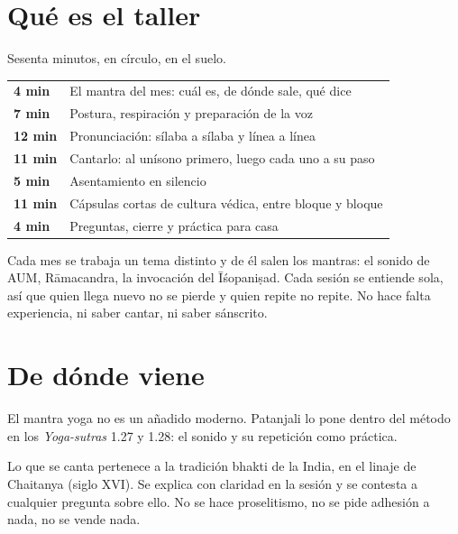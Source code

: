 \documentclass[11pt,a4paper]{article}
\begin{document}
\section{Qué es el taller}

Sesenta minutos, en círculo, en el suelo.

\vspace{0.4em}
{\setlength{\extrarowheight}{3pt}
\begin{tabularx}{\textwidth}{@{}>{\titular\bfseries\color{ocre}}l@{\hspace{1.3em}}X@{}}
\toprule
4 min  & El mantra del mes: cuál es, de dónde sale, qué dice \\
7 min  & Postura, respiración y preparación de la voz \\
12 min & Pronunciación: sílaba a sílaba y línea a línea \\
11 min & Cantarlo: al unísono primero, luego cada uno a su paso \\
5 min  & Asentamiento en silencio \\
11 min & Cápsulas cortas de cultura védica, entre bloque y bloque \\
4 min  & Preguntas, cierre y práctica para casa \\
\bottomrule
\end{tabularx}}

\vspace{0.6em}
Cada mes se trabaja un tema distinto y de él salen los mantras: el sonido de
AUM, R\=amacandra, la invocaci\'on del \=I\'sopani\d{s}ad. Cada sesión se entiende sola, así
que quien llega nuevo no se pierde y quien repite no repite. No hace falta
experiencia, ni saber cantar, ni saber sánscrito.

\newpage


\section{De dónde viene}

El mantra yoga no es un añadido moderno. Patanjali lo pone dentro del método en
los \textit{Yoga-sutras} 1.27 y 1.28: el sonido y su repetición como práctica.

Lo que se canta pertenece a la tradición bhakti de la India, en el linaje de
Chaitanya (siglo XVI). Se explica con claridad en la sesión y se contesta a
cualquier pregunta sobre ello. No se hace proselitismo, no se pide adhesión a
nada, no se vende nada.
\end{document}
